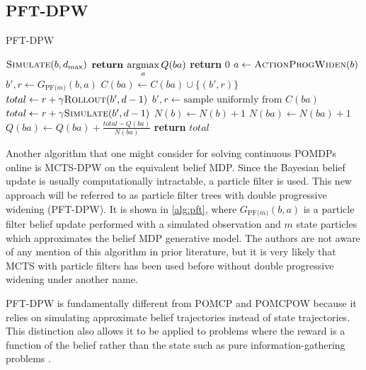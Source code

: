 \subsection{PFT-DPW} \label{sec:pftdpw}

\begin{algorithm}[htbp]
    \caption{PFT-DPW} \label{alg:pft}
    \begin{algorithmic}[1]
                \State $\Call{Simulate}{b, d_\text{max}}$
            \EndFor
            \State $\textbf{return } \underset{a}{\argmax}\, Q(ba)$
        \EndProcedure
                \State \textbf{return} $0$
            \EndIf
            \State $a \gets \Call{ActionProgWiden}{b}$
                \State $b',r \gets G_\text{PF($m$)}(b,a)$
                \State $C(ba) \gets C(ba) \cup \{(b',r)\}$
                \State $total \gets r + \gamma \Call{Rollout}{b', d-1}$
            \Else
                \State $b', r \gets \text{sample uniformly from } C(ba)$
                \State $total \gets r + \gamma \Call{Simulate}{b', d-1}$
            \EndIf
            \State $N(b) \gets N(b)+1$
            \State $N(ba) \gets N(ba)+1$
            \State $Q(ba) \gets Q(ba) + \frac{total - Q(ba)}{N(ba)}$
            \State \textbf{return} $total$
        \EndProcedure
    \end{algorithmic}
\end{algorithm}


Another algorithm that one might consider for solving continuous POMDPs online is MCTS-DPW on the equivalent belief MDP.
Since the Bayesian belief update is usually computationally intractable, a particle filter is used.
This new approach will be referred to as particle filter trees with double progressive widening (PFT-DPW).
It is shown in \cref{alg:pft}, where $G_\text{PF($m$)}(b,a)$ is a particle filter belief update performed with a simulated observation and $m$ state particles which approximates the belief MDP generative model.
The authors are not aware of any mention of this algorithm in prior literature, but it is very likely that MCTS with particle filters has been used before without double progressive widening under another name.

PFT-DPW is fundamentally different from POMCP and POMCPOW because it relies on simulating approximate belief trajectories instead of state trajectories.
This distinction also allows it to be applied to problems where the reward is a function of the belief rather than the state such as pure information-gathering problems \cite{dressel2017efficient,araya2010pomdp}.

